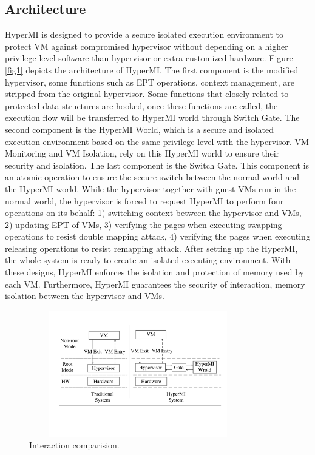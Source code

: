 \documentclass[conference]{IEEEtran}
\begin{document}
\subsection{Architecture} 
HyperMI is designed to provide a secure isolated execution environment to protect VM against compromised hypervisor without depending on a higher privilege level software than hypervisor or extra customized hardware.
Figure \ref{fig1} depicts the architecture of HyperMI. The first component is the modified hypervisor, some functions such as EPT operations, context management, are stripped from the original hypervisor. Some functions that closely related to protected data structures are hooked, once these functions are called, the execution flow will be transferred to HyperMI world through Switch Gate. The second component is the HyperMI World, which is a secure and isolated execution environment based on the same privilege level with the hypervisor. VM Monitoring and VM Isolation, rely on this HyperMI world to ensure their security and isolation. The last component is the Switch Gate. This component is an atomic operation to ensure the secure switch between the normal world and the HyperMI world. 
While the hypervisor together with guest VMs run in the normal world, the hypervisor is forced to request HyperMI to perform four operations on its behalf: 1) switching context between the hypervisor and VMs, 2) updating EPT of VMs, 3) verifying the pages when executing swapping operations to resist double mapping attack, 4) verifying the pages when executing releasing operations to resist remapping attack. After setting up the HyperMI, the whole system is ready to create an isolated executing environment. With these designs, HyperMI enforces the isolation and protection of memory used by each VM. Furthermore, HyperMI guarantees the security of interaction, memory isolation between the hypervisor and VMs.
\begin{figure}
\centerline{\includegraphics[width=9.5cm, height=5.5cm]{pdfvmcsProcess.pdf}}
\caption{Interaction comparision. } \label{fig+1}
\end{figure}
\end{document}
